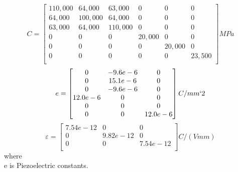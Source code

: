 \documentclass[11pt]{article}
\begin{document}
$$
C = \begin{bmatrix}
110,000 & 64,000 & 63,000 & 0 & 0 & 0\\
64,000 & 100,000 & 64,000 & 0 & 0 & 0\\
63,000 & 64,000 & 110,000 & 0 & 0 & 0\\
0 & 0 & 0 & 20,000 & 0 & 0\\
0 & 0 & 0 & 0 & 20,000 & 0\\
0 & 0 & 0 & 0 & 0 & 23,500\\
\end{bmatrix} MPa
$$  
$$
e = \begin{bmatrix}
0 & -9.6e-6 & 0 \\
0 & 15.1e-6 & 0 \\
0 & -9.6e-6 & 0\\
12.0e-6 & 0 & 0 \\
0 & 0 & 0 \\
0 & 0 & 12.0e-6 \\
\end{bmatrix} C/ mm`2
$$
$$
\varepsilon = \begin{bmatrix}
7.54e-12 & 0 & 0 \\
0 & 9.82e-12 & 0 \\
0 & 0 & 7.54e-12\\
\end{bmatrix} C/(V mm)
$$
where \\
e is Piezoelectric constants.








\noindent

 
\end{document}
